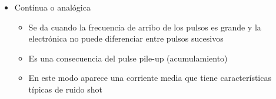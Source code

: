 \documentclass{beamer}
\begin{document}
\begin{frame}
\begin{columns}
\begin{column}{0.60\textwidth}
\begin{block}{}
\begin{itemize}
\item Contínua o analógica 
\begin{itemize}
\item Se da cuando la frecuencia de arribo de los pulsos es grande y la
electrónica no puede diferenciar entre pulsos sucesivos 
\item Es una consecuencia del pulse pile-up (acumulamiento)
\item En este modo aparece una corriente media que tiene características
típicas de ruido shot
\end{itemize}
\end{itemize}
\end{block}
\end{column} 
\begin{column}{0.40\textwidth}
\begin{center}
\end{center}
\end{column}
\end{columns}
\end{frame} 
\end{document}
